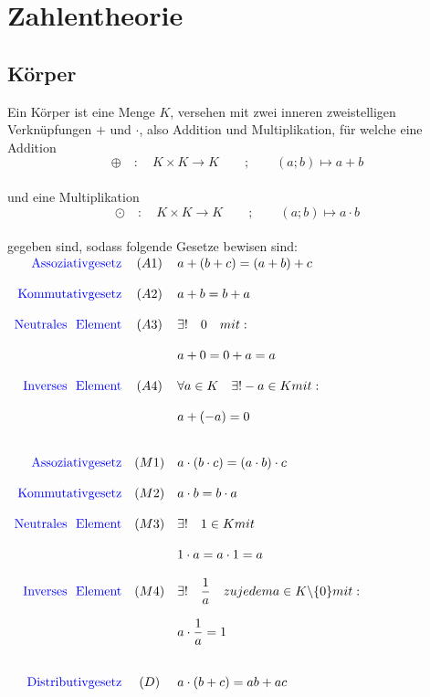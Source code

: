 \documentclass[main.tex]{subfiles}
\begin{document}
\chapter{Zahlentheorie}

\section{Körper}


\begin{Definition}
	Ein Körper ist eine Menge $K$, versehen mit zwei inneren zweistelligen Verknüpfungen $+$ und $\cdot$, also Addition und Multiplikation, für welche eine Addition
	$$\oplus\quad : \quad K \times K \rightarrow K \qquad;\qquad(a;b) \longmapsto a+b $$\\
	und eine Multiplikation
	$$\odot \quad : \quad K \times K \rightarrow K \qquad;\qquad(a;b) \longmapsto a \cdot b $$\\
	gegeben sind, sodass folgende Gesetze bewisen sind:\\

	$\begin{array}{rcl}
		\text{\color{blue}Assoziativgesetz} &  (A1) & a+(b+c) = (a+b)+c \\\\
		\text{\color{blue}Kommutativgesetz} &  (A2) & a+b = b+a\\\\
		\text{\color{blue}Neutrales\,\, Element} &  (A3) & \exists ! \quad 0 \quad  mit:  \\\\
		& & a+0 = 0+a = a\\\\
		\text{\color{blue}Inverses\,\, Element} &  (A4) & \forall a\in K \quad \exists ! -a \in K  mit:  \\\\
		 & &a+(-a) = 0\\\\\\
		\text{\color{blue}Assoziativgesetz} &  (M1) & a\cdot (b \cdot c) = (a\cdot b) \cdot c \\\\
		\text{\color{blue}Kommutativgesetz} &  (M2) & a\cdot b = b\cdot a    \\\\
		\text{\color{blue}Neutrales\,\, Element} &  (M3) & \exists ! \quad 1 \in K  mit \\\\
		& & 1\cdot a = a \cdot 1 = a  \\\\
		\text{\color{blue}Inverses\,\, Element} & (M4) & \exists ! \quad \dfrac{1}{a} \quad zu jedem a \in K \backslash \{0\}  mit: \\\\
		 && a \cdot \dfrac{1}{a} = 1 \\\\\\
		\text{\color{blue}Distributivgesetz} & (D) & a\cdot (b+c) = ab + ac \\
	\end{array}$
\end{Definition}
\end{document}
